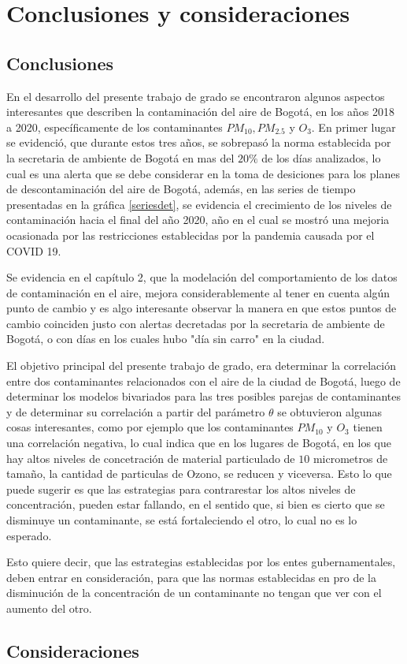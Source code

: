 \chapter{Conclusiones y consideraciones}

\section{Conclusiones}

En el desarrollo del presente trabajo de grado se encontraron algunos aspectos interesantes que describen la contaminación del aire de Bogotá, en los años 2018 a 2020, específicamente de los contaminantes $PM_{10}, PM_{2.5} $ y $O_3$. En primer lugar se evidenció, que durante estos tres años, se sobrepasó la norma establecida por la secretaria de ambiente de Bogotá en mas del $20\%$ de los días analizados, lo cual es una alerta que se debe considerar en la toma de desiciones para los planes de descontaminación del aire de Bogotá, además, en las series de tiempo presentadas en la gráfica \ref{seriesdet}, se evidencia el crecimiento de los niveles de contaminación hacia el final del año 2020, año en el cual se mostró una mejoria ocasionada por las restricciones establecidas por la pandemia causada por el COVID 19. 

Se evidencia en el capítulo 2, que la modelación del comportamiento de los datos de contaminación en el aire, mejora considerablemente al tener en cuenta algún punto de cambio y es algo interesante observar la manera en que estos puntos de cambio coinciden justo con alertas decretadas por la secretaria de ambiente de Bogotá, o con días en los cuales hubo "día sin carro" en la ciudad.

El objetivo principal del presente trabajo de grado, era determinar la correlación entre dos contaminantes relacionados con el aire de la ciudad de Bogotá, luego de determinar los modelos bivariados para las tres posibles parejas de contaminantes y de determinar su correlación a partir del parámetro $\theta$ se obtuvieron algunas cosas interesantes, como por ejemplo que los contaminantes $PM_10$ y $O_3$ tienen una correlación negativa, lo cual indica que en los lugares de Bogotá, en los que hay altos niveles de concetración de material particulado de $10$ micrometros de tamaño, la cantidad de particulas de Ozono, se reducen y viceversa. Esto lo que puede sugerir es que las estrategias para contrarestar los altos niveles de concentración, pueden estar fallando, en el sentido que, si bien es cierto que se disminuye un contaminante, se está fortaleciendo el otro, lo cual no es lo esperado. 

Esto quiere decir, que las estrategias establecidas por los entes gubernamentales, deben entrar en consideración, para que las normas establecidas en pro de la disminución de la concentración de un contaminante no tengan que ver con el aumento del otro. 


\section{Consideraciones}